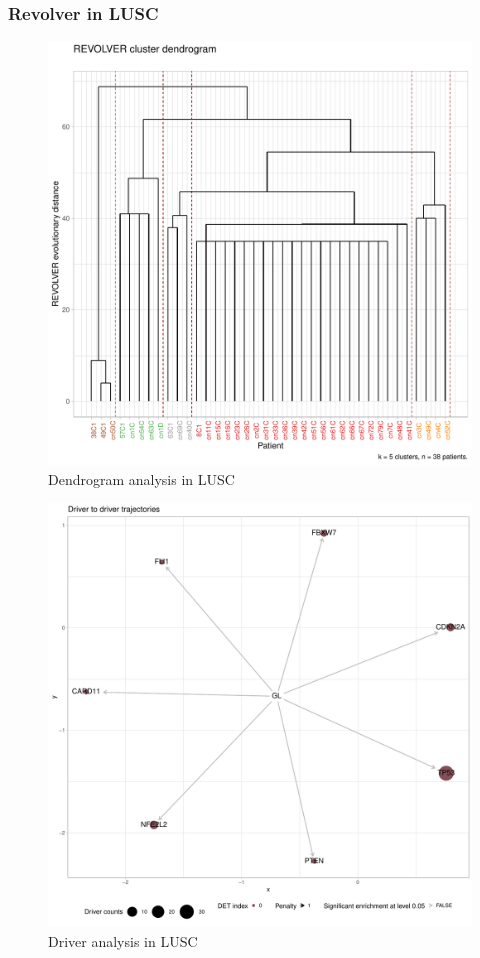 \documentclass{beamer}
\begin{document}
    \begin{frame}[allowframebreaks]
        \frametitle{Revolver in LUSC}

        \begin{figure}
            \includegraphics[width=0.5 \linewidth]{figures/Revolver/BWA/SQC.dendrogram.pdf}
            \caption{Dendrogram analysis in LUSC}
        \end{figure}

        \begin{figure}
            \includegraphics[width=0.5 \linewidth]{figures/Revolver/BWA/SQC.driver.pdf}
            \caption{Driver analysis in LUSC}
        \end{figure}
    \end{frame}
\end{document}

